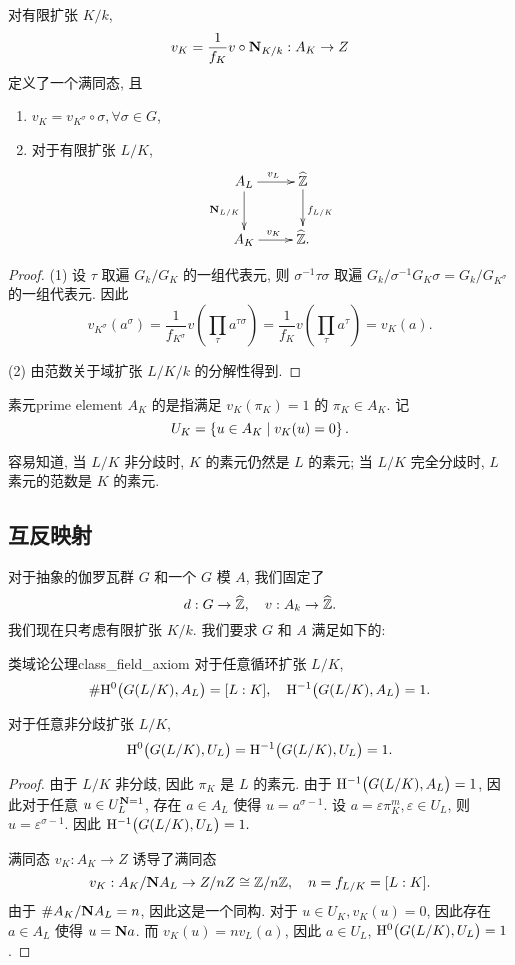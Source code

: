 \begin{proposition}{}{}
对有限扩张 $K/k$, 
  \[v_K=\frac{1}{f_K}v\circ{\mathbf{N}}_{K/k}:A_K\to Z\]
定义了一个满同态, 且
\begin{enumerate}
\item $v_K=v_{K^\sigma}\circ \sigma,\forall \sigma\in G$,
\item 对于有限扩张 $L/K$,
  \[\xymatrix{
A_L\ar[r]^{v_L}\ar[d]_{\bfN_{L/K}} &\wh \BZ\ar[d]^{f_{L/K}}\\
A_K\ar[r]^{v_K} &\wh\BZ.
}\]
\end{enumerate}
\end{proposition}
\begin{proof}
(1) 设 $\tau$ 取遍 $G_k/G_K$ 的一组代表元, 则 $\sigma^{-1}\tau\sigma$ 取遍 $G_k/\sigma^{-1}G_K\sigma=G_k/G_{K^\sigma}$ 的一组代表元. 因此
  \[v_{K^\sigma}(a^\sigma)=\frac{1}{f_{K^\sigma}}v(\prod_\tau a^{\tau\sigma})=\frac{1}{f_K}v(\prod_\tau a^\tau)=v_K(a).\]

(2) 由范数关于域扩张 $L/K/k$ 的分解性得到.
\end{proof}

\begin{definition}{素元}{prime element}
$A_K$ 的是指满足 $v_K(\pi_K)=1$ 的 $\pi_K\in A_K$. 记
  \[U_K=\left\{u\in A_K\mid v_K(u)=0\right\}.\]
\end{definition}

容易知道, 当 $L/K$ 非分歧时, $K$ 的素元仍然是 $L$ 的素元; 当 $L/K$ 完全分歧时, $L$ 素元的范数是 $K$ 的素元.


\subsection{互反映射}
对于抽象的伽罗瓦群 $G$ 和一个 $G$ 模 $A$, 我们固定了
  \[d:G\to \widehat {{\mathbb{Z}}},\quad v:A_k\to \widehat {{\mathbb{Z}}}.\]
我们现在只考虑有限扩张 $K/k$.
我们要求 $G$ 和 $A$ 满足如下的:

\begin{axiom}{类域论公理}{class_field_axiom}
对于任意循环扩张 $L/K$,
  \[\#{\mathrm{H}}^0\bigl(G(L/K),A_L\bigr)=[L:K],\quad {\mathrm{H}}^{-1}\bigl(G(L/K),A_L\bigr)=1.\]
\end{axiom}

\begin{proposition}{}{}
对于任意非分歧扩张 $L/K$,
  \[{\mathrm{H}}^0\bigl(G(L/K),U_L\bigr)={\mathrm{H}}^{-1}\bigl(G(L/K),U_L\bigr)=1.\]
\end{proposition}

\begin{proof}
由于 $L/K$ 非分歧, 因此 $\pi_K$ 是 $L$ 的素元. 由于 ${\mathrm{H}}^{-1}\bigl(G(L/K),A_L\bigr)=1$, 因此对于任意 $u\in U_L^{{\mathbf{N}}=1}$, 存在 $a\in A_L$ 使得 $u=a^{\sigma-1}$. 设 $a=\varepsilon \pi_K^m, \varepsilon\in U_L$, 则 $u=\varepsilon^{\sigma-1}$. 因此 ${\mathrm{H}}^{-1}\bigl(G(L/K),U_L\bigr)=1.$

满同态 $v_K:A_K\to Z$ 诱导了满同态
  \[v_K: A_K/{\mathbf{N}} A_L\to Z/nZ\cong {\mathbb{Z}}/n{\mathbb{Z}},\quad n=f_{L/K}=[L:K].\]
由于 $\# A_K/{\mathbf{N}} A_L=n$, 因此这是一个同构. 对于 $u\in U_K, v_K(u)=0$, 因此存在 $a\in A_L$ 使得 $u={\mathbf{N}} a$. 而 $v_K(u)=nv_L(a)$, 因此 $a\in U_L$, ${\mathrm{H}}^0\bigl(G(L/K),U_L\bigr)=1$.
\end{proof}

